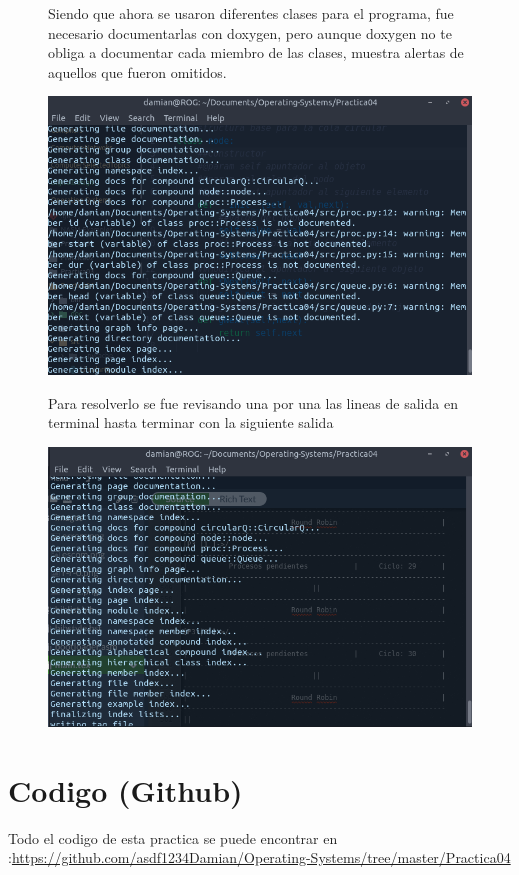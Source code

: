 \documentclass[12pt]{article}
\begin{document}
\begin{figure}[!htb]
\begin{minipage}{0.45\textwidth}
Siendo que ahora se usaron diferentes clases para el programa, fue necesario documentarlas con doxygen, pero aunque doxygen no te obliga a documentar cada miembro de las clases, muestra alertas de aquellos que fueron omitidos. 
\end{minipage}
\begin{minipage}{0.45\textwidth}
\includegraphics{errors.png}
\end{minipage}
\end{figure}

\begin{figure}[!htb]
\begin{minipage}{0.45\textwidth}
Para resolverlo se fue revisando una por una las lineas de salida en terminal hasta terminar con la siguiente salida
\end{minipage}
\begin{minipage}{0.45\textwidth}
\includegraphics{fix.png}
\end{minipage}
\end{figure}


\section{Codigo (Github)}
Todo el codigo de esta practica se puede encontrar en :\url{https://github.com/asdf1234Damian/Operating-Systems/tree/master/Practica04}
\nocite{*}


\end{document}
